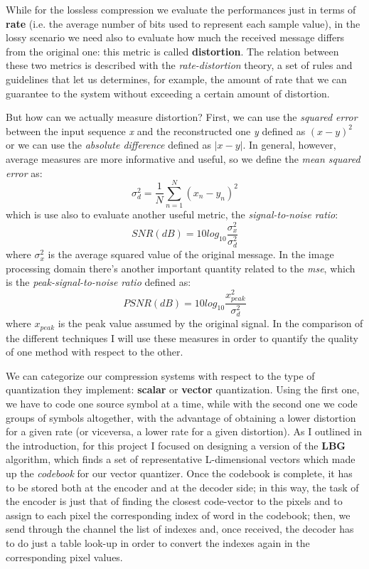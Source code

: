 \documentclass{report}
\begin{document}
While for the lossless compression we evaluate the performances just in terms of \textbf{rate} (i.e. the average number of bits used to represent each sample value), in the lossy scenario we need also to evaluate how much the received message differs from the original one: this metric is called \textbf{distortion}. The relation between these two metrics is described with the \textit{rate-distortion} theory, a set of rules and guidelines that let us determines, for example, the amount of rate that we can guarantee to the system without exceeding a certain amount of distortion.

But how can we actually measure distortion? First, we can use the \textit{squared error} between the input sequence \textit{x} and the reconstructed one \textit{y} defined as $(x-y)^2$ or we can use the \textit{absolute difference} defined as $|x-y|$. In general, however, average measures are more informative and useful, so we define the \textit{mean squared error} as: 
\begin{equation}
\sigma^2_d = \frac{1}{N} \sum_{n = 1}^{N} (x_n - y_n)^2
\end{equation}
which is use also to evaluate another useful metric, the \textit{signal-to-noise ratio}:
\begin{equation}
SNR(dB) = 10log_{10}\frac{\sigma^2_x}{\sigma^2_d} 
\end{equation}
where $\sigma^2_x$ is the average squared value of the original message. In the image processing domain there's another important quantity related to the \textit{mse}, which is the \textit{peak-signal-to-noise ratio} defined as: 
\begin{equation}
PSNR(dB) = 10log_{10}\frac{x^2_{peak}}{\sigma^2_d} 
\end{equation}
where $x_{peak}$ is the peak value assumed by the original signal. In the comparison of the different techniques I will use these measures in order to quantify the quality of one method with respect to the other.

We can categorize our compression systems with respect to the type of quantization they implement: \textbf{scalar} or \textbf{vector} quantization. Using the first one, we have to code one source symbol at a time, while with the second one we code groups of symbols altogether, with the advantage of obtaining a lower distortion for a given rate (or viceversa, a lower rate for a given distortion). As I outlined in the introduction, for this project I focused on designing a version of the \textbf{LBG} algorithm, which finds a set of representative L-dimensional vectors which made up the \textit{codebook} for our vector quantizer. Once the codebook is complete, it has to be stored both at the encoder and at the decoder side; in this way, the task of the encoder is just that of finding the closest code-vector to the pixels and to assign to each pixel the corresponding index of word in the codebook; then, we send through the channel the list of indexes and, once received, the decoder has to do just a table look-up in order to convert the indexes again in the corresponding pixel values.
\end{document}
